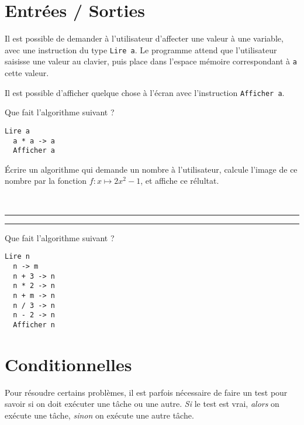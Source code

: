 \section{Entrées / Sorties}

Il est possible de demander à l'utilisateur d'affecter une valeur à une
variable, avec une instruction du type \texttt{Lire a}. Le programme attend que
l'utilisateur saisisse une valeur au clavier, puis place dans l'espace mémoire
correspondant à \texttt{a} cette valeur.

Il est possible d'afficher quelque chose à l'écran avec l'instruction
\texttt{Afficher a}.

\begin{exemple}Que fait l'algorithme suivant ?
  \begin{lstlisting}[language=naturel,frame=lines]
  Lire a
  a * a -> a
  Afficher a
  \end{lstlisting}
\end{exemple}

\begin{multicols}{2}
\begin{exercice}
  Écrire un algorithme qui demande un nombre à l'utilisateur,
  calcule l'image de ce nombre par la fonction $f:x\mapsto2x^2-1$, et affiche
  ce rélultat.

  ~

  \hrule
  \vspace{2cm}
  \hrule
\end{exercice}

\columnbreak

\begin{exercice}Que fait l'algorithme suivant ?
  \begin{lstlisting}[language=naturel,frame=lines]
  Lire n
  n -> m
  n + 3 -> n
  n * 2 -> n
  n + m -> n
  n / 3 -> n
  n - 2 -> n
  Afficher n
  \end{lstlisting}
\end{exercice}
\end{multicols}

\section{Conditionnelles}

\begin{definition}
Pour résoudre certains problèmes, il est parfois nécessaire de faire un test
pour savoir si on doit exécuter une tâche ou une autre. \emph{Si} le test est
vrai, \emph{alors} on exécute une tâche, \emph{sinon} on exécute une autre
tâche.
\end{definition}

